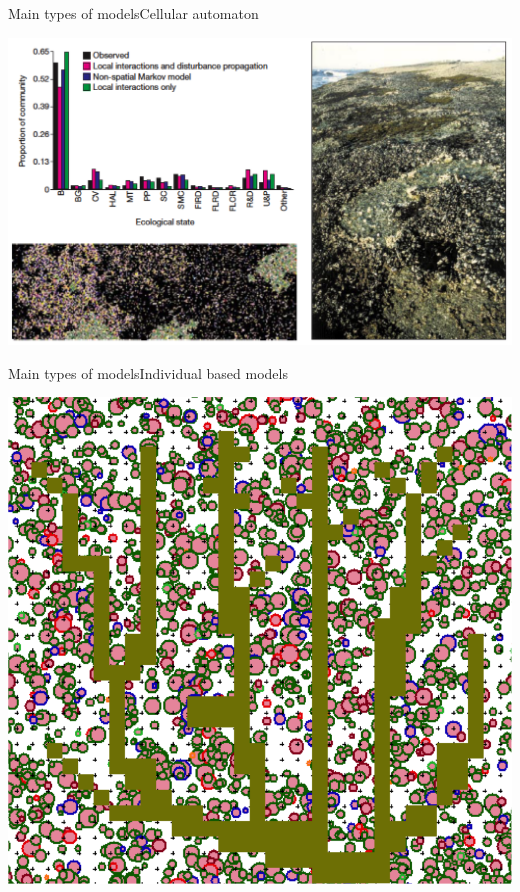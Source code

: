 \documentclass{eecslides}
\begin{document}

	\begin{frame}{Main types of models}{Cellular automaton}

		\begin{center}
			\includegraphics[height=0.65\textheight]{cellular_automaton_model}
		\end{center}

	\end{frame}


	\begin{frame}{Main types of models}{Individual based models}

		\begin{center}
			\includegraphics[height=0.65\textheight]{ibm}
		\end{center}

	\end{frame}
\end{document}
